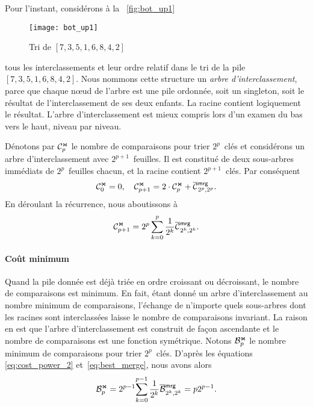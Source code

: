 Pour l'instant, considérons à la \fig~\vref{fig:bot_up1}
\begin{figure}
\centering
\texttt{[image: bot\_up1]}
\caption{Tri de \([7,3,5,1,6,8,4,2]\)}
\label{fig:bot_up1}
\end{figure}
tous les interclassements et leur ordre relatif dans le tri de la pile
\([7, 3, 5, 1, 6, 8, 4, 2]\). Nous nommons cette structure un
\emph{arbre d'interclassement}, parce que
chaque n{\oe}ud de l'arbre est une pile ordonnée, soit un singleton,
soit le résultat de l'interclassement de ses deux enfants. La racine
contient logiquement le résultat. L'arbre d'interclassement est mieux
compris lors d'un examen du bas vers le haut, niveau par
niveau.

Dénotons par \(\mathcal{C}_{p}^{\Join}\) le nombre de comparaisons pour trier
\(2^p\)~clés et considérons un arbre d'interclassement avec
\(2^{p+1}\)~feuilles. Il est constitué de deux sous-arbres immédiats
de \(2^p\)~feuilles chacun, et la racine contient
\(2^{p+1}\)~clés. Par conséquent
\begin{equation*}
\C{\Join}{0} = 0,
\quad
\C{\Join}{p+1} = 2 \cdot \C{\Join}{p} + \OC{\fun{mrg}}{2^p,2^p}.
\end{equation*}
En déroulant la récurrence, nous aboutissons à
\begin{equation}
\C{\Join}{p+1}
  = 2^p\sum_{k=0}^p{\frac{1}{2^k}\OC{\fun{mrg}}{2^k,2^k}}.
\index{mrg@$\C{\Join}{n}$}
\label{eq:cost_power_2}
\end{equation}

\paragraph{Coût minimum}

Quand la pile donnée est déjà triée en ordre croissant ou décroissant,
le nombre de comparaisons est minimum. En fait, étant donné un arbre
d'interclassement au nombre minimum de
comparaisons, l'échange de
n'importe quels sous-arbres dont les racines sont interclassées laisse
le nombre de comparaisons invariant. La raison en est que l'arbre
d'interclassement est construit de façon ascendante et le nombre de
comparaisons est une fonction symétrique.  Notons \(\mathcal{B}_{p}^{\Join}\) le
nombre minimum de comparaisons pour trier \(2^p\)~clés. D'après les
équations \eqref{eq:cost_power_2} et~\eqref{eq:best_merge}, nous avons
alors
\begin{equation}
\B{\Join}{p}
  = 2^{p-1}\!\sum_{k=0}^{p-1}{\frac{1}{2^k}\OB{\fun{mrg}}{2^k,2^k}}
  = p2^{p-1}.\label{eq:best_power}\index{mrg@$\B{\Join}{n}$}
\end{equation}

